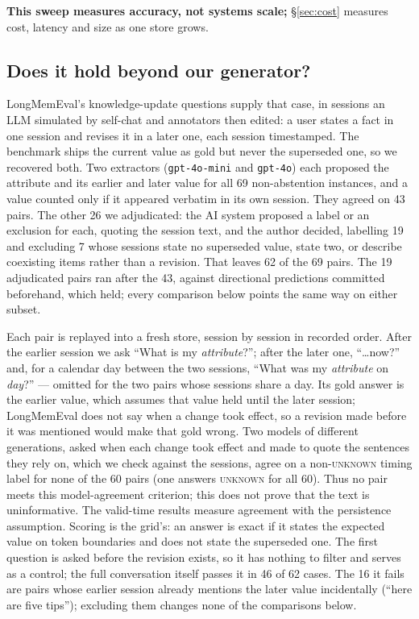 \documentclass[conference]{IEEEtran}
\begin{document}
\textbf{This sweep measures accuracy, not systems scale;} \S\ref{sec:cost}
measures cost, latency and size as one store grows.

\subsection{Does it hold beyond our generator?}\label{sec:realdata}

LongMemEval's knowledge-update questions
\citep{longmemeval} supply that case, in sessions an LLM simulated by self-chat
and annotators then edited: a user states a fact in one session and
revises it in a later one, each session timestamped. The benchmark ships the
current value as gold but never the superseded one, so we recovered both. Two
extractors (\texttt{gpt-4o-mini} and \texttt{gpt-4o}) each proposed the
attribute and its earlier and later value for all 69 non-abstention instances,
and a value counted only if it appeared verbatim in its own session. They
agreed on 43 pairs. The other 26 we adjudicated: the AI system proposed a label
or an exclusion for each, quoting the session text, and the author decided,
labelling 19 and excluding 7 whose sessions state no superseded value, state
two, or describe coexisting items rather than a revision. That leaves 62 of the
69 pairs. The 19 adjudicated pairs ran after the 43, against directional
predictions committed beforehand, which held; every comparison below points
the same way on either subset.

Each pair is replayed into a fresh store, session by session in recorded order.
After the earlier session we ask ``What is my \emph{attribute}?''; after the
later one, ``\ldots now?'' and, for a calendar day between the two sessions,
``What was my \emph{attribute} on \emph{day}?'' --- omitted for the two pairs
whose sessions share a day. Its gold answer is the earlier value, which assumes
that value held until the later session; LongMemEval does not say when a change
took effect, so a revision made before it was mentioned would make that gold
wrong. Two models of different generations, asked when each change took
effect and made to quote the sentences they rely on, which we check against the
sessions, agree on a non-\textsc{unknown} timing label for none of the 60
pairs (one answers \textsc{unknown} for all 60). Thus no pair meets this
model-agreement criterion; this does not prove that the text is uninformative.
The valid-time results measure agreement with the persistence assumption. Scoring is the grid's: an answer is exact if it
states the expected value on token boundaries and does not state the
superseded one. The first question is asked before the revision exists, so it
has nothing to filter and serves as a control; the full conversation itself
passes it in 46 of 62 cases. The 16 it fails are pairs whose earlier session
already mentions the later value incidentally (``here are five tips'');
excluding them changes none of the comparisons below.
\end{document}

